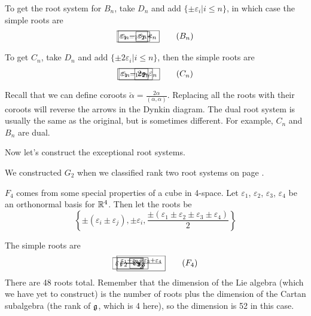  To get the root system for $B_n$, take $D_n$
 and add $\{\pm\varepsilon_i| i\le n\}$, in which case the simple roots are
 \[\begin{xy}
   (0,0) *{\varepsilon_1 - \varepsilon_2} *+\frm{-}; (1,0) **@{-};
   (1.5,0) **{\hspace{.2mm}.\hspace{.2mm}};
   (2.8,0) *{\varepsilon_{n-1} - \varepsilon_{n}} *+\frm{-} **@{-};
   (4.5,0) *{\varepsilon_{n}} *+\frm{-} **@{=} ?<>(.5)*@{>};
 \end{xy}\tag{$B_n$}\]

 To get $C_n$, take $D_n$ and add $\{\pm
 2\varepsilon_i|i\le n\}$, then the simple roots are
 \[\begin{xy}
   (0,0) *{\varepsilon_1 - \varepsilon_2} *+\frm{-}; (1,0) **@{-};
   (1.5,0) **{\hspace{.2mm}.\hspace{.2mm}};
   (2.8,0) *{\varepsilon_{n-1} - \varepsilon_{n}} *+\frm{-} **@{-};
   (4.6,0) *{2\varepsilon_{n}} *+\frm{-} **@{=} ?<>(.5)*@{<};
 \end{xy}\tag{$C_n$}\]

 \begin{remark}
  Recall that we can define coroots $\check \alpha = \frac{2\alpha}{(\alpha,\alpha)}$.
  Replacing all the roots with their coroots will reverse the arrows in the Dynkin
  diagram. The dual root system is usually the same as the
  original, but is sometimes different. For example, $C_n$ and $B_n$ are dual.
 \end{remark}

 Now let's construct the exceptional root systems.

 We constructed $G_2$ when we classified rank two root systems on page
 \pageref{lec14Rmkrank2}.

 $F_4$ comes from some special properties of a
 cube in 4-space. Let $\varepsilon_1$, $\varepsilon_2$, $\varepsilon_3$,
 $\varepsilon_4$ be an orthonormal basis for $\mathbb{R}^4$. Then let the roots be
 \[
 \left\{\pm(\varepsilon_i \pm \varepsilon_j), \pm \varepsilon_i, \frac{\pm
(\varepsilon_1\pm \varepsilon_2 \pm \varepsilon_3 \pm \varepsilon_4)}{2}\right\}
 \]

 The simple roots are
 \[\begin{xy}
   (0,0) *{\e_1-\e_2} *+\frm{-};
   p+(2,0) *{\e_2-\e_3} *+\frm{-} **@{-};
   p+(1.5,0) *{\e_3} *+\frm{-} **@{=}; {?<>(.6)*@{>}},
   p+(2,0) *{\frac{\e_1 +\e_2 +\e_3 +\e_4}{2}} *+\frm{-} **@{-};
 \end{xy}
 \tag{$F_4$}\] There are 48 roots total. Remember that the dimension of the Lie
 algebra (which we have yet to construct) is the number of roots plus the dimension of the
 Cartan subalgebra (the rank of $\mathfrak{g}$, which is 4 here), so the dimension is 52 in this
 case.

